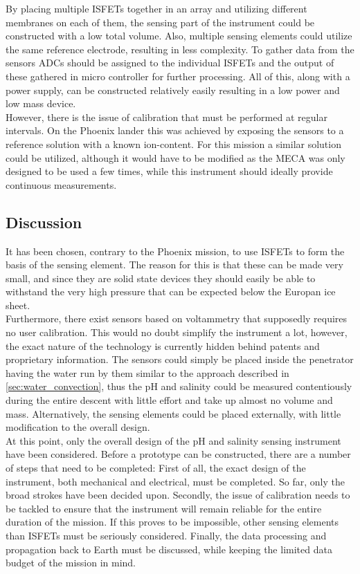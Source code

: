 \noindent
By placing multiple ISFETs together in an array and utilizing different membranes on each of them, the sensing part of the instrument could be constructed with a low total volume. Also, multiple sensing elements could utilize the same reference electrode, resulting in less complexity. To gather data from the sensors ADCs should be assigned to the individual ISFETs and the output of these gathered in micro controller for further processing. All of this, along with a power supply, can be constructed relatively easily resulting in a low power and low mass device. \\

\noindent
However, there is the issue of calibration that must be performed at regular intervals. On the Phoenix lander this was achieved by exposing the sensors to a reference solution with a known ion-content\cite{article:jgre2487}. For this mission a similar solution could be utilized, although it would have to be modified as the MECA was only designed to be used a few times, while this instrument should ideally provide continuous measurements.  

\subsection{Discussion}

It has been chosen, contrary to the Phoenix mission, to use ISFETs to form the basis of the sensing element. The reason for this is that these can be made very small, and since they are solid state devices they should easily be able to withstand the very high pressure that can be expected below the Europan ice sheet.\\

\noindent
Furthermore, there exist sensors based on voltammetry that supposedly requires no user calibration\cite{website:senova}. This would no doubt simplify the instrument a lot, however, the exact nature of the technology is currently hidden behind patents and proprietary information. The sensors could simply be placed inside the penetrator having the water run by them similar to the approach described in \ref{sec:water_convection}, thus the pH and salinity could be measured contentiously during the entire descent with little effort and take up almost no volume and mass. Alternatively, the sensing elements could be placed externally, with little modification to the overall design.\\

\noindent
At this point, only the overall design of the pH and salinity sensing instrument have been considered. Before a prototype can be constructed, there are a number of steps that need to be completed:
First of all, the exact design of the instrument, both mechanical and electrical, must be completed. So far, only the broad strokes have been decided upon. Secondly, the issue of calibration needs to be tackled to ensure that the instrument will remain reliable for the entire duration of the mission. If this proves to be impossible, other sensing elements than ISFETs must be seriously considered. Finally, the data processing and propagation back to Earth must be discussed, while keeping the limited data budget of the mission in mind.
